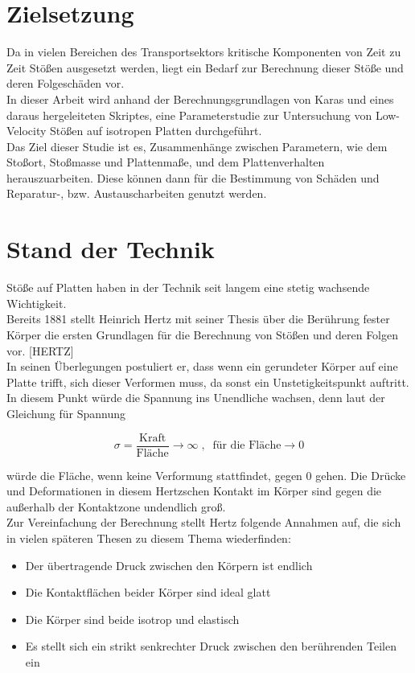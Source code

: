 \section{Zielsetzung}
Da in vielen Bereichen des Transportsektors kritische Komponenten von Zeit zu
Zeit Stößen ausgesetzt werden, liegt ein Bedarf zur Berechnung dieser Stöße und
deren Folgeschäden vor. \\
In dieser Arbeit wird anhand der Berechnungsgrundlagen von Karas und eines
daraus hergeleiteten Skriptes, eine Parameterstudie zur Untersuchung von
Low-Velocity Stößen auf isotropen Platten durchgeführt. \\
Das Ziel dieser Studie ist es, Zusammenhänge zwischen Parametern, wie dem Stoßort,
Stoßmasse und Plattenmaße, und dem Plattenverhalten herauszuarbeiten. Diese
können dann für die Bestimmung von Schäden und Reparatur-, bzw.
Austauscharbeiten genutzt werden.\\

\section{Stand der Technik}

Stöße auf Platten haben in der Technik seit langem eine stetig wachsende
Wichtigkeit. \\
Bereits 1881 stellt Heinrich Hertz mit seiner Thesis über die Berührung fester
Körper die ersten Grundlagen für die Berechnung von Stößen und deren Folgen vor.
[HERTZ] \\
In seinen Überlegungen postuliert er, dass wenn ein gerundeter Körper auf eine
Platte trifft, sich dieser Verformen muss, da sonst ein Unstetigkeitspunkt
auftritt. In diesem Punkt würde die Spannung ins Unendliche wachsen, denn laut
der Gleichung für Spannung 

\begin{equation}
\sigma = \frac{\mbox{Kraft}}{\mbox{Fläche}} \rightarrow \infty \; , \; \; \mbox{für die Fläche} \rightarrow 0
\end{equation}

würde die Fläche, wenn keine Verformung stattfindet, gegen 0 gehen. Die Drücke
und Deformationen in diesem Hertzschen Kontakt im Körper sind gegen die
außerhalb der Kontaktzone undendlich groß. \\
Zur Vereinfachung der Berechnung stellt Hertz folgende Annahmen auf, die sich in
vielen späteren Thesen zu diesem Thema wiederfinden: 
\begin{itemize}
	\item Der übertragende Druck zwischen den Körpern ist endlich
	\item Die Kontaktflächen beider Körper sind ideal glatt
	\item Die Körper sind beide isotrop und elastisch
	\item Es stellt sich ein strikt senkrechter Druck zwischen den berührenden Teilen ein
\end{itemize}

